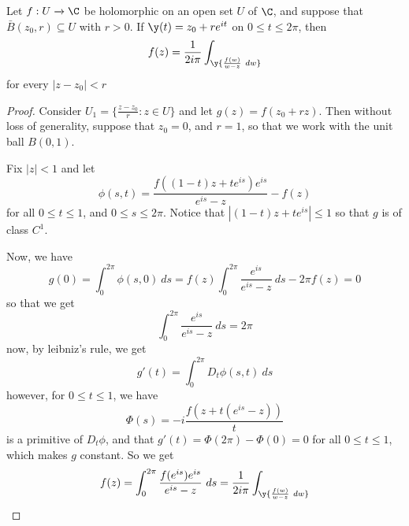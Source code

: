 \begin{lemma}\label{4.3.2}
    Let $f:U \xrightarrow{} \C$ be holomorphic on an open set $U$ of  $\C$, and
    suppose that  $\bar{B}(z_0,r) \subseteq U$ with $r>0$. If
    $\y(t)=z_0+re^{it}$ on $0 \leq t \leq 2\pi$, then
    \begin{equation*}
        f(z)=\frac{1}{2i\pi}\int_\y{\frac{f(w)}{w-z} \ dw}
    \end{equation*}
    for every $|z-z_0|<r$
\end{lemma}
\begin{proof}
    Consider $U_1=\{\frac{z-z_0}{r} : z \in U\}$ and let $g(z)=f(z_0+rz)$. Then
    without loss of generality, suppose that $z_0=0$, and $r=1$, so that we work
    with the unit ball  $B(0,1)$.

    Fix $|z|<1$ and let
    \begin{equation*}
        \phi(s,t)=\frac{f((1-t)z+te^{is})e^{is}}{e^{is}-z}-f(z)
    \end{equation*}
    for all $0 \leq t \leq 1$, and  $0 \leq s \leq 2\pi$. Notice that
    $|(1-t)z+te^{is}| \leq 1$ so that $g$ is of class  $C^1$.

    Now, we have
    \begin{equation*}
        g(0)=\int_0^{2\pi}{\phi(s,0) \
        ds}=f(z)\int_0^{2\pi}{\frac{e^{is}}{e^{is}-z} \ ds}-2\pi{f(z)}=0
    \end{equation*}
    so that we get
    \begin{equation*}
        \int_0^{2\pi}{\frac{e^{is}}{e^{is}-z} \ ds}=2\pi
    \end{equation*}
    now, by leibniz's rule, we get
    \begin{equation*}
        g'(t)=\int_0^{2\pi}{D_t{\phi(s,t)} \ ds}
    \end{equation*}
    however, for $0 \leq t \leq 1$, we have
    \begin{equation*}
        \Phi(s)=-i\frac{f(z+t(e^{is}-z))}{t}
    \end{equation*}
    is a primitive of $D_t{\phi}$, and that $g'(t)=\Phi(2\pi)-\Phi(0)=0$ for all
    $0 \leq t \leq 1$, which makes  $g$ constant. So we get
    \begin{equation}
        f(z)=\int_0^{2\pi}{\frac{f(e^{is})e^{is}}{e^{is}-z} \ ds}
        =\frac{1}{2i\pi}\int_\y{\frac{f(w)}{w-z} \ dw}
    \end{equation}
\end{proof}

